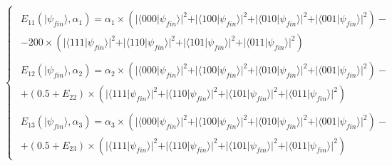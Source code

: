  

 \begin{equation}
 \begin{cases}
\begin{split}
E_{11}(\vert\psi_{fin}\rangle, \alpha_{1})=\alpha_{1}\times(\vert\langle000\vert\psi_{fin}\rangle\vert^{2} + \vert\langle100\vert\psi_{fin}\rangle\vert^{2}
+ \vert\langle010\vert\psi_{fin}\rangle\vert^{2}
+ \vert\langle001\vert\psi_{fin}\rangle\vert^{2}
 ) - \\
 - 200\times(\vert\langle111\vert\psi_{fin}\rangle\vert^{2} + \vert\langle110\vert\psi_{fin}\rangle\vert^{2}
+ \vert\langle101\vert\psi_{fin}\rangle\vert^{2}
+ \vert\langle011\vert\psi_{fin}\rangle\vert^{2}
 )
\end{split}
\\
\begin{split}
E_{12}(\vert\psi_{fin}\rangle, \alpha_{2})=\alpha_{2}\times(\vert\langle000\vert\psi_{fin}\rangle\vert^{2} + \vert\langle100\vert\psi_{fin}\rangle\vert^{2}
+ \vert\langle010\vert\psi_{fin}\rangle\vert^{2}
+ \vert\langle001\vert\psi_{fin}\rangle\vert^{2}
 ) - \\
 + (0.5 + E_{22})\times(\vert\langle111\vert\psi_{fin}\rangle\vert^{2} + \vert\langle110\vert\psi_{fin}\rangle\vert^{2}
+ \vert\langle101\vert\psi_{fin}\rangle\vert^{2}
+ \vert\langle011\vert\psi_{fin}\rangle\vert^{2}
 )
\end{split}
\\
\begin{split}
E_{13}(\vert\psi_{fin}\rangle, \alpha_{3})=\alpha_{3}\times(\vert\langle000\vert\psi_{fin}\rangle\vert^{2} + \vert\langle100\vert\psi_{fin}\rangle\vert^{2}
+ \vert\langle010\vert\psi_{fin}\rangle\vert^{2}
+ \vert\langle001\vert\psi_{fin}\rangle\vert^{2}
 ) - \\
 + (0.5 + E_{23})\times(\vert\langle111\vert\psi_{fin}\rangle\vert^{2} + \vert\langle110\vert\psi_{fin}\rangle\vert^{2}
+ \vert\langle101\vert\psi_{fin}\rangle\vert^{2}
+ \vert\langle011\vert\psi_{fin}\rangle\vert^{2}
 )
\end{split}
\end{cases}
\label{eq:pirates_payoff32}
\end{equation}

